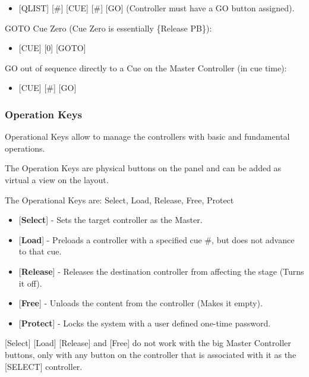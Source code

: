 \documentclass[
]{article}
\providecommand{\tightlist}{%
  \setlength{\itemsep}{0pt}\setlength{\parskip}{0pt}}
\begin{document}
\begin{itemize}
\tightlist
\item
  {[}QLIST{]} {[}\#{]} {[}CUE{]} {[}\#{]} {[}GO{]} (Controller must have a GO button assigned).
\end{itemize}

GOTO Cue Zero (Cue Zero is essentially \{Release PB\}):

\begin{itemize}
\tightlist
\item
  {[}CUE{]} {[}0{]} {[}GOTO{]}
\end{itemize}

GO out of sequence directly to a Cue on the Master Controller (in cue time):

\begin{itemize}
\tightlist
\item
  {[}CUE{]} {[}\#{]} {[}GO{]}
\end{itemize}

\hypertarget{operation-keys}{%
\subsubsection{Operation Keys}\label{operation-keys}}

Operational Keys allow to manage the controllers with basic and fundamental operations.

The Operation Keys are physical buttons on the panel and can be added as virtual a view on the layout.

The Operational Keys are: Select, Load, Release, Free, Protect

\begin{itemize}
\item
  {[}\textbf{Select}{]} - Sets the target controller as the Master.
\item
  {[}\textbf{Load}{]} - Preloads a controller with a specified cue \#, but does not advance to that cue.
\item
  {[}\textbf{Release}{]} - Releases the destination controller from affecting the stage (Turns it off).
\item
  {[}\textbf{Free}{]} - Unloads the content from the controller (Makes it empty).
\item
  {[}\textbf{Protect}{]} - Locks the system with a user defined one-time password.
\end{itemize}

{{[}Select{]} {[}Load{]} {[}Release{]} and {[}Free{]} do not work with the big Master Controller buttons, only with any button on the controller that is associated with it as the {[}SELECT{]} controller.}
\end{document}
